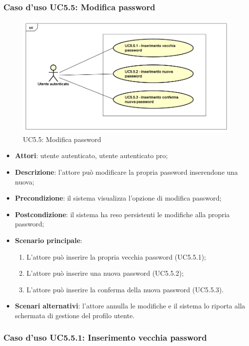 \subsubsection{Caso d'uso UC5.5: Modifica password}
\label{UC5.5}
\begin{figure}[h]
	\centering
	\includegraphics[scale=0.5,keepaspectratio]{UML/UC5_5.png}
	\caption{UC5.5: Modifica password}
\end{figure}

\begin{itemize}
	\item \textbf{Attori}: utente autenticato, utente autenticato pro;
	\item \textbf{Descrizione}: l'attore può modificare la propria password inserendone una nuova;
	\item \textbf{Precondizione}: il sistema visualizza l'opzione di modifica password;
	\item \textbf{Postcondizione}: il sistema ha reso persistenti le modifiche alla propria password;
	\item \textbf{Scenario principale}:
	\begin{enumerate}
		\item L'attore può inserire la propria vecchia password (UC5.5.1);
		\item L'attore può inserire una nuova password (UC5.5.2);
		\item L'attore può inserire la conferma della nuova password (UC5.5.3).
	\end{enumerate}
	\item \textbf{Scenari alternativi}: l'attore annulla le modifiche e il sistema lo riporta alla schermata di gestione del profilo utente.
\end{itemize}

\subsubsection{Caso d'uso UC5.5.1: Inserimento vecchia password}


